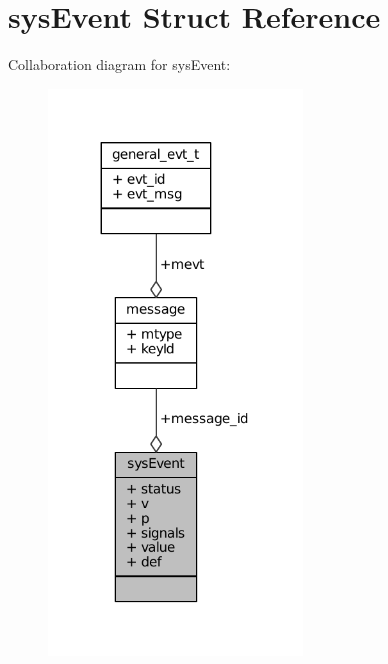 \hypertarget{structsysEvent}{}\section{sys\+Event Struct Reference}
\label{structsysEvent}


Collaboration diagram for sys\+Event\+:\nopagebreak
\begin{figure}[H]
\begin{center}
\leavevmode
\includegraphics[width=191pt]{structsysEvent__coll__graph}
\end{center}
\end{figure}
